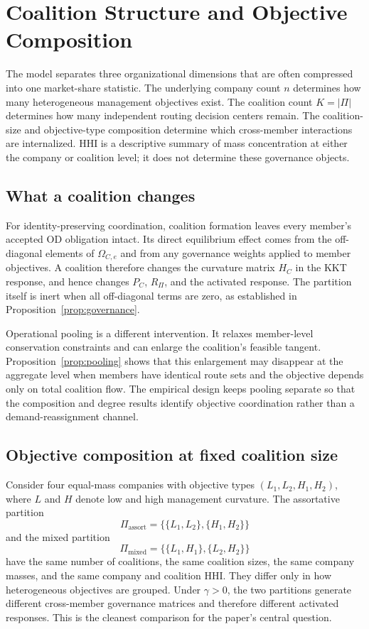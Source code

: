 \section{Coalition Structure and Objective Composition}\label{sec:ownership}

The model separates three organizational dimensions that are often compressed into one market-share statistic. The underlying company count $n$ determines how many heterogeneous management objectives exist. The coalition count $K=|\Pi|$ determines how many independent routing decision centers remain. The coalition-size and objective-type composition determine which cross-member interactions are internalized. HHI is a descriptive summary of mass concentration at either the company or coalition level; it does not determine these governance objects.

\subsection{What a coalition changes}

For identity-preserving coordination, coalition formation leaves every member's accepted OD obligation intact. Its direct equilibrium effect comes from the off-diagonal elements of $\Omega_{C,e}$ and from any governance weights applied to member objectives. A coalition therefore changes the curvature matrix $H_C$ in the KKT response, and hence changes $P_C$, $R_\Pi$, and the activated response. The partition itself is inert when all off-diagonal terms are zero, as established in Proposition~\ref{prop:governance}.

Operational pooling is a different intervention. It relaxes member-level conservation constraints and can enlarge the coalition's feasible tangent. Proposition~\ref{prop:pooling} shows that this enlargement may disappear at the aggregate level when members have identical route sets and the objective depends only on total coalition flow. The empirical design keeps pooling separate so that the composition and degree results identify objective coordination rather than a demand-reassignment channel.

\subsection{Objective composition at fixed coalition size}

Consider four equal-mass companies with objective types $(L_1,L_2,H_1,H_2)$, where $L$ and $H$ denote low and high management curvature. The assortative partition
\[
 \Pi_{\mathrm{assort}}=\{\{L_1,L_2\},\{H_1,H_2\}\}
\]
and the mixed partition
\[
 \Pi_{\mathrm{mixed}}=\{\{L_1,H_1\},\{L_2,H_2\}\}
\]
have the same number of coalitions, the same coalition sizes, the same company masses, and the same company and coalition HHI. They differ only in how heterogeneous objectives are grouped. Under $\gamma>0$, the two partitions generate different cross-member governance matrices and therefore different activated responses. This is the cleanest comparison for the paper's central question.


